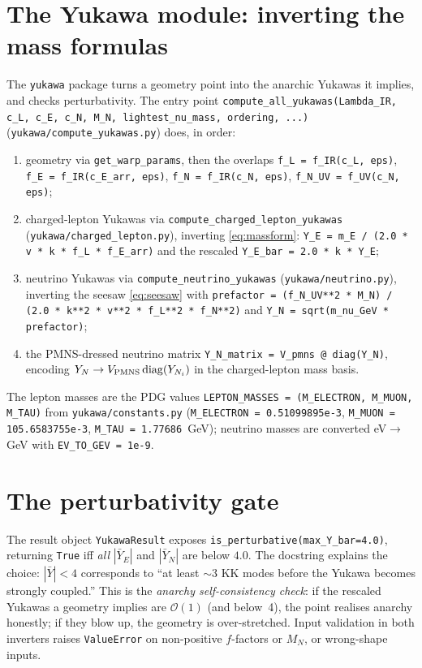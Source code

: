 \documentclass[11pt]{article}
\newcommand{\code}[1]{\texttt{#1}}
\theoremstyle{definition}
\begin{document}
\section{The Yukawa module: inverting the mass formulas}
\label{sec:codeyuk}

The \code{yukawa} package turns a geometry point into the anarchic Yukawas it
implies, and checks perturbativity. The entry point
\code{compute\_all\_yukawas(Lambda\_IR, c\_L, c\_E, c\_N, M\_N,
lightest\_nu\_mass, ordering, ...)} (\code{yukawa/compute\_yukawas.py}) does, in
order:
\begin{enumerate}[leftmargin=1.6em]
\item geometry via \code{get\_warp\_params}, then the overlaps
\code{f\_L = f\_IR(c\_L, eps)}, \code{f\_E = f\_IR(c\_E\_arr, eps)},
\code{f\_N = f\_IR(c\_N, eps)}, \code{f\_N\_UV = f\_UV(c\_N, eps)};
\item charged-lepton Yukawas via \code{compute\_charged\_lepton\_yukawas}
(\code{yukawa/charged\_lepton.py}), inverting \eqref{eq:massform}:
\code{Y\_E = m\_E / (2.0 * v * k * f\_L * f\_E\_arr)} and the rescaled
\code{Y\_E\_bar = 2.0 * k * Y\_E};
\item neutrino Yukawas via \code{compute\_neutrino\_yukawas}
(\code{yukawa/neutrino.py}), inverting the seesaw \eqref{eq:seesaw} with
\code{prefactor = (f\_N\_UV**2 * M\_N) / (2.0 * k**2 * v**2 * f\_L**2 * f\_N**2)}
and \code{Y\_N = sqrt(m\_nu\_GeV * prefactor)};
\item the PMNS-dressed neutrino matrix
\code{Y\_N\_matrix = V\_pmns @ diag(Y\_N)}, encoding $Y_N\to V_{\rm PMNS}\,{\rm
diag}(Y_{N_i})$ in the charged-lepton mass basis.
\end{enumerate}
The lepton masses are the PDG values \code{LEPTON\_MASSES = (M\_ELECTRON,
M\_MUON, M\_TAU)} from \code{yukawa/constants.py} (\code{M\_ELECTRON =
0.51099895e-3}, \code{M\_MUON = 105.6583755e-3}, \code{M\_TAU = 1.77686}~GeV);
neutrino masses are converted eV$\to$GeV with \code{EV\_TO\_GEV = 1e-9}.

\section{The perturbativity gate}
\label{sec:codepert}

The result object \code{YukawaResult} exposes
\code{is\_perturbative(max\_Y\_bar=4.0)}, returning \code{True} iff
\emph{all} $|\bar Y_E|$ and $|\bar Y_N|$ are below $4.0$. The docstring explains
the choice: $|\bar Y|<4$ corresponds to ``at least $\sim3$ KK modes before the
Yukawa becomes strongly coupled.'' This is the \emph{anarchy self-consistency
check}: if the rescaled Yukawas a geometry implies are $\mathcal{O}(1)$ (and
below~4), the point realises anarchy honestly; if they blow up, the geometry is
over-stretched. Input validation in both inverters raises \code{ValueError} on
non-positive $f$-factors or $M_N$, or wrong-shape inputs.
\end{document}
